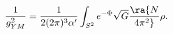 \begin{equation}\label{raggen}
{1\over g_{YM}^2}= \frac{1}{2(2\pi)^3\alpha^\prime}\int_{S^2} e^{-\Phi}\sqrt{G}\ra{N\over4\pi^2}\rho.
\end{equation}

